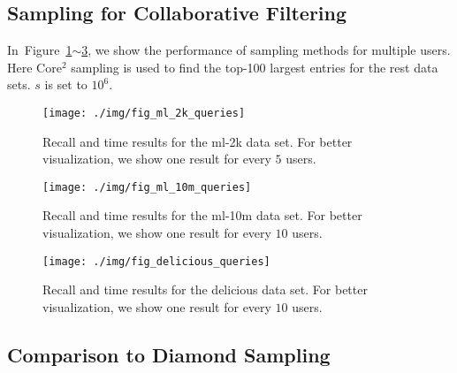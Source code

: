 \documentclass[letterpaper]{article}
\newcommand{\Figs}[2]{Figure~\ref{fig:#1}$\sim$\ref{fig:#2}}
\begin{document}
\subsection{Sampling for Collaborative Filtering}
In~\Figs{ml_2k_queries}{delicious_queries}, we show the performance of sampling methods for multiple users.
Here Core$^2$ sampling is used to find the top-100 largest entries for the rest data sets.
$s$ is set to $10^6$.
\begin{figure}[H]
  \centering
  \texttt{[image: ./img/fig\_ml\_2k\_queries]}\\
  \caption{Recall and time results for the ml-2k data set.
           For better visualization, we show one result for every $5$ users.}
  \label{fig:ml_2k_queries}
\end{figure}
\begin{figure}[H]
  \centering
  \texttt{[image: ./img/fig\_ml\_10m\_queries]}\\
  \caption{Recall and time results for the ml-10m data set.
           For better visualization, we show one result for every $10$ users.}
  \label{fig:ml_10m_queries}
\end{figure}
\begin{figure}[H]
  \centering
  \texttt{[image: ./img/fig\_delicious\_queries]}\\
  \caption{Recall and time results for the delicious data set.
           For better visualization, we show one result for every $10$ users.}
  \label{fig:delicious_queries}
\end{figure}

\subsection{Comparison to Diamond Sampling}
\end{document}
